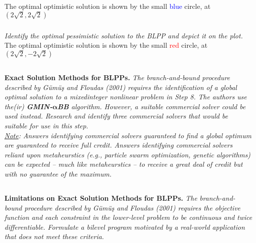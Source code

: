 \documentclass[12pt]{amsart}
\begin{document}
	The optimal optimistic solution is shown by the small \textcolor{blue}{blue} circle, at $(2\sqrt{2},2\sqrt{2})$

\subsubsection{}
\textit{Identify the optimal pessimistic solution to the BLPP and depict it on the plot.} \\

	The optimal optimistic solution is shown by the small \textcolor{red}{red} circle, at $(2\sqrt{2},-2\sqrt{2})$ \\

\subsection{}
\textbf{Exact Solution Methods for BLPPs.} 
\textit{The branch-and-bound procedure described by Gümüş and Floudas (2001) requires the identification of a global optimal solution to a mixedinteger nonlinear problem in Step 8. The authors use the(ir) \textbf{GMIN-}$\mathbf\alpha$\textbf{BB} algorithm. However, a suitable commercial solver could be used instead. Research and identify three commercial solvers that would be suitable for use in this step.} \\

\textit{\underline{Note}: Answers identifying commercial solvers guaranteed to find a global optimum are guaranteed to receive full credit. Answers identifying commercial solvers reliant upon metaheurstics (e.g., particle swarm optimization, genetic algorithms) can be expected -- much like metaheurstics -- to receive a great deal of credit but with no guarantee of the
maximum.}



\subsection{}
\textbf{Limitations on Exact Solution Methods for BLPPs.} 
\textit{The branch-and-bound procedure described by Gümüş and Floudas (2001) requires the objective function and each constraint in the lower-level problem to be continuous and twice differentiable. Formulate a bilevel program motivated by a real-world application that does not meet these criteria.}
\end{document}
